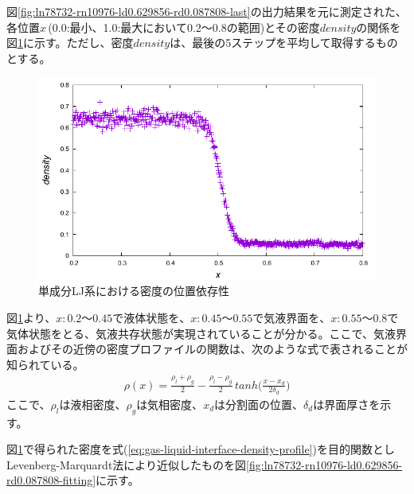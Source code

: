 \documentclass[titlepage]{jsreport}
\begin{document}
図\ref{fig:ln78732-rn10976-ld0.629856-rd0.087808-last}の出力結果を元に測定された、各位置$x$\,(0.0:最小、1.0:最大において0.2〜0.8の範囲)とその密度$density$の関係を図\ref{fig:ln78732-rn10976-ld0.629856-rd0.087808}に示す。ただし、密度$density$は、最後の5ステップを平均して取得するものとする。

\begin{figure}[htbp]
    \begin{center}
        \includegraphics[width=14cm]{fig/ln78732-rn10976-ld0.629856-rd0.087808/ln78732-rn10976-ld0.629856-rd0.087808.pdf}
    \end{center}
    \caption{単成分LJ系における密度の位置依存性}
    \label{fig:ln78732-rn10976-ld0.629856-rd0.087808}
\end{figure}

図\ref{fig:ln78732-rn10976-ld0.629856-rd0.087808}より、$x:0.2〜0.45$で液体状態を、$x:0.45〜0.55$で気液界面を、$x:0.55〜0.8$で気体状態をとる、気液共存状態が実現されていることが分かる。ここで、気液界面およびその近傍の密度プロファイルの関数は、次のような式で表されることが知られている\cite{gas-liquid-interface-density-profile}。
\large
\begin{eqnarray}
    \rho(x) = \frac{\rho_l+\rho_g}{2} - \frac{\rho_l-\rho_g}{2}\,tanh\Bigg(\frac{x-x_d}{2\delta_d}\Bigg) \label{eq:gas-liquid-interface-density-profile}
\end{eqnarray}
\normalsize
ここで、$\rho_l$は液相密度、$\rho_g$は気相密度、$x_d$は分割面の位置、$\delta_d$は界面厚さを示す。

図\ref{fig:ln78732-rn10976-ld0.629856-rd0.087808}で得られた密度を式(\ref{eq:gas-liquid-interface-density-profile})を目的関数としLevenberg-Marquardt法により近似したものを図\ref{fig:ln78732-rn10976-ld0.629856-rd0.087808-fitting}に示す。
\end{document}
